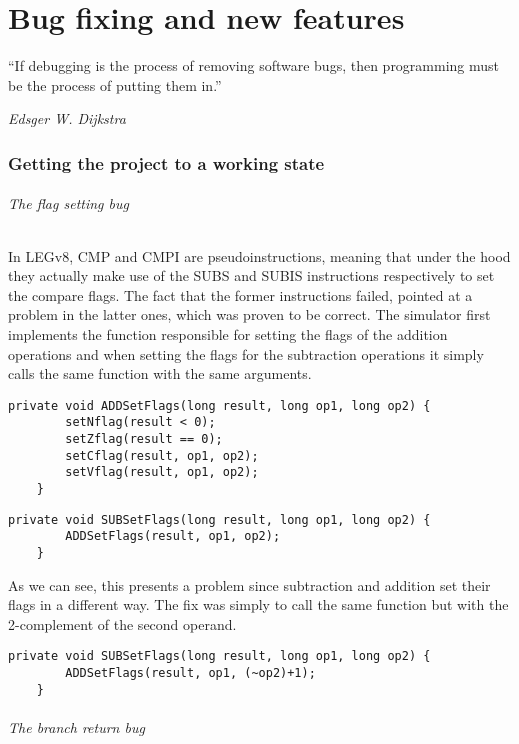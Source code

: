 \chapter{Bug fixing and new features}\label{chap:lipsum}

\epigraph{``If debugging is the process of removing software bugs, then programming must be the process of putting them in.''}{\textit{Edsger W. Dijkstra}}

\subsection*{Getting the project to a working state}

\subparagraph*{The flag setting bug}

In LEGv8, CMP and CMPI are pseudoinstructions, meaning that under the hood they actually make use of the SUBS and SUBIS instructions respectively to set the compare flags. The fact that the former instructions failed, pointed at a problem in the latter ones, which was proven to be correct. The simulator first implements the function responsible for setting the flags of the addition operations and when setting the flags for the subtraction operations it simply calls the same function with the same arguments.
\begin{lstlisting}[caption={The adddition flag-setting code}]
	private void ADDSetFlags(long result, long op1, long op2) {
		setNflag(result < 0);
		setZflag(result == 0);
		setCflag(result, op1, op2);
		setVflag(result, op1, op2);
	}
\end{lstlisting}
\begin{lstlisting}[caption={The buggy subtraction flag-setting code}]
	private void SUBSetFlags(long result, long op1, long op2) {
		ADDSetFlags(result, op1, op2);
	}
\end{lstlisting}
As we can see, this presents a problem since subtraction and addition set their flags in a different way. The fix was simply to call the same function but with the 2-complement of the second operand.
\begin{lstlisting}[caption={The fixed subtraction flag-setting code}]
	private void SUBSetFlags(long result, long op1, long op2) {
		ADDSetFlags(result, op1, (~op2)+1);
	}
\end{lstlisting}

\subparagraph*{The branch return bug}

